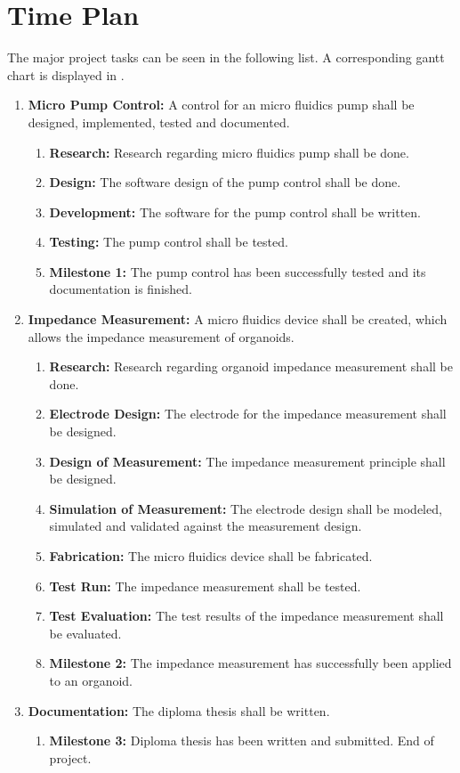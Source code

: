 \section{Time Plan}
\label{sec:time_plan}

The major project tasks can be seen in the following list. A corresponding gantt chart is displayed in .
\begin{enumerate}
\item \textbf{Micro Pump Control:} A control for an micro fluidics pump shall be designed, implemented, tested and documented.
    \begin{enumerate}
        \item \textbf{Research:} Research regarding micro fluidics pump shall be done. 
        \item \textbf{Design:} The software design of the pump control shall be done.
        \item \textbf{Development:} The software for the pump control shall be written.
        \item \textbf{Testing:} The pump control shall be tested.
        \item \textbf{Milestone 1:} The pump control has been successfully tested and its documentation is finished.
    \end{enumerate}
\item \textbf{Impedance Measurement:} A micro fluidics device shall be created, which allows the impedance measurement of organoids.
    \begin{enumerate}
        \item \textbf{Research:} Research regarding organoid impedance measurement shall be done. 
        \item \textbf{Electrode Design:} The electrode for the impedance measurement shall be designed.
        \item \textbf{Design of Measurement:} The impedance measurement principle shall be designed.
        \item \textbf{Simulation of Measurement:} The electrode design shall be modeled, simulated and validated against the measurement design.
        \item \textbf{Fabrication:} The micro fluidics device shall be fabricated.
        \item \textbf{Test Run:} The impedance measurement shall be tested.
        \item \textbf{Test Evaluation:} The test results of the impedance measurement shall be evaluated.
        \item \textbf{Milestone 2:} The impedance measurement has successfully been applied to an organoid.
    \end{enumerate}
\item \textbf{Documentation:} The diploma thesis shall be written.
    \begin{enumerate}
        \item \textbf{Milestone 3:} Diploma thesis has been written and submitted. End of project.
    \end{enumerate}
\end{enumerate}
 


 
 
 
 

